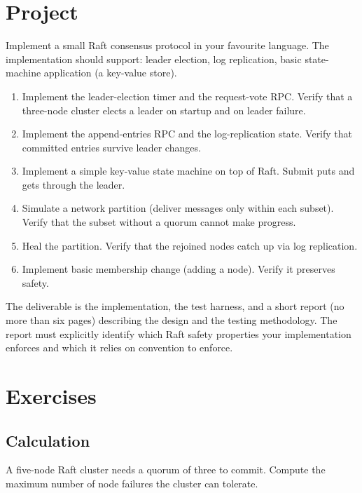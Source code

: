 \section{Project}

\begin{project}
Implement a small Raft consensus protocol in your favourite language. The implementation should support: leader election, log replication, basic state-machine application (a key-value store).

\begin{enumerate}[leftmargin=*]
  \item Implement the leader-election timer and the request-vote RPC. Verify that a three-node cluster elects a leader on startup and on leader failure.
  \item Implement the append-entries RPC and the log-replication state. Verify that committed entries survive leader changes.
  \item Implement a simple key-value state machine on top of Raft. Submit puts and gets through the leader.
  \item Simulate a network partition (deliver messages only within each subset). Verify that the subset without a quorum cannot make progress.
  \item Heal the partition. Verify that the rejoined nodes catch up via log replication.
  \item Implement basic membership change (adding a node). Verify it preserves safety.
\end{enumerate}

The deliverable is the implementation, the test harness, and a short report (no more than six pages) describing the design and the testing methodology. The report must explicitly identify which Raft safety properties your implementation enforces and which it relies on convention to enforce.
\end{project}

\section{Exercises}

\subsection*{Calculation}

\begin{exercise}
A five-node Raft cluster needs a quorum of three to commit. Compute the maximum number of node failures the cluster can tolerate.
\end{exercise}

